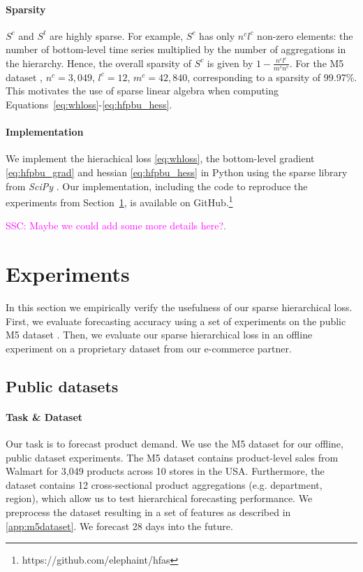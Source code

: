 \documentclass[preprint, 3p, times, twocolumn]{elsarticle}
\newcommand{\ssc}[1]{\textcolor{magenta}{SSC: #1.}}
\begin{document}
\paragraph{Sparsity} \(S^c\) and \(S^t\) are highly sparse. For example, \(S^c\) has only \(n^cl^c\) non-zero elements: the number of bottom-level time series multiplied by the number of aggregations in the hierarchy. Hence, the overall sparsity of \(S^c\) is given by \( 1 - \frac{n^cl^c}{m^cn^c} \). For the M5 dataset \cite{makridakis_m5_2021}, \(n^c = 3,049\), \(l^c = 12\), \(m^c=42,840\), corresponding to a sparsity of 99.97\%. This motivates the use of sparse linear algebra when computing Equations~\eqref{eq:whloss}-\eqref{eq:hfpbu_hess}.

\paragraph{Implementation} We implement the hierachical loss \eqref{eq:whloss}, the bottom-level gradient \eqref{eq:hfpbu_grad} and hessian \eqref{eq:hfpbu_hess} in Python using the sparse library from \textit{SciPy} \cite{virtanen_scipy_2020}. Our implementation, including the code to reproduce the experiments from Section~\ref{sec:experiments}, is available on GitHub.\footnote{https://github.com/elephaint/hfas}

\ssc{Maybe we could add some more details here?}

\section{Experiments}
  \label{sec:experiments}
  In this section we empirically verify the usefulness of our sparse hierarchical loss. First, we evaluate forecasting accuracy using a set of experiments on the public M5 dataset \cite{makridakis_m5_2021}. Then, we evaluate our sparse hierarchical loss in an offline experiment on a proprietary dataset from our e-commerce partner.

  \subsection{Public datasets} \label{subsec:publicdatasets}
  \paragraph{Task \& Dataset} Our task is to forecast product demand. We use the M5 dataset \cite{makridakis_m5_2021} for our offline, public dataset experiments. The M5 dataset contains product-level sales from Walmart for 3,049 products across 10 stores in the USA. Furthermore, the dataset contains 12 cross-sectional product aggregations (e.g. department, region), which allow us to test hierarchical forecasting performance. We preprocess the dataset resulting in a set of features as described in \ref{app:m5dataset}. We forecast 28 days into the future.
  
\end{document}
